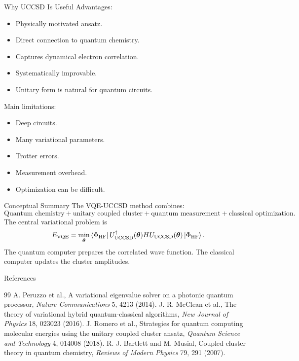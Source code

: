 \documentclass[aspectratio=169]{beamer}
\begin{document}
\begin{frame}{Why UCCSD Is Useful}
Advantages:
\begin{itemize}
\item Physically motivated ansatz.
\item Direct connection to quantum chemistry.
\item Captures dynamical electron correlation.
\item Systematically improvable.
\item Unitary form is natural for quantum circuits.
\end{itemize}
\vspace{0.3cm}
Main limitations:
\begin{itemize}
\item Deep circuits.
\item Many variational parameters.
\item Trotter errors.
\item Measurement overhead.
\item Optimization can be difficult.
\end{itemize}
\end{frame}
\begin{frame}{Conceptual Summary}
The VQE-UCCSD method combines:
\[
\text{Quantum chemistry}
+
\text{unitary coupled cluster}
+
\text{quantum measurement}
+
\text{classical optimization}.
\]
\vspace{0.4cm}
The central variational problem is
\[
E_{\mathrm{VQE}}
=
\min_{\bm{\theta}}
\bra{\Phi_{\mathrm{HF}}}
U^\dagger_{\mathrm{UCCSD}}(\bm{\theta})
H
U_{\mathrm{UCCSD}}(\bm{\theta})
\ket{\Phi_{\mathrm{HF}}}.
\]
\vspace{0.3cm}
The quantum computer prepares the correlated wave function.
The classical computer updates the cluster amplitudes.
\end{frame}
\begin{frame}{References}
\footnotesize
\begin{thebibliography}{99}
A. Peruzzo et al.,
\newblock A variational eigenvalue solver on a photonic quantum processor,
\newblock \emph{Nature Communications} 5, 4213 (2014).
J. R. McClean et al.,
\newblock The theory of variational hybrid quantum-classical algorithms,
\newblock \emph{New Journal of Physics} 18, 023023 (2016).
J. Romero et al.,
\newblock Strategies for quantum computing molecular energies using the unitary coupled cluster ansatz,
\newblock \emph{Quantum Science and Technology} 4, 014008 (2018).
R. J. Bartlett and M. Musial,
\newblock Coupled-cluster theory in quantum chemistry,
\newblock \emph{Reviews of Modern Physics} 79, 291 (2007).
\end{thebibliography}
\end{frame}
\end{document}

